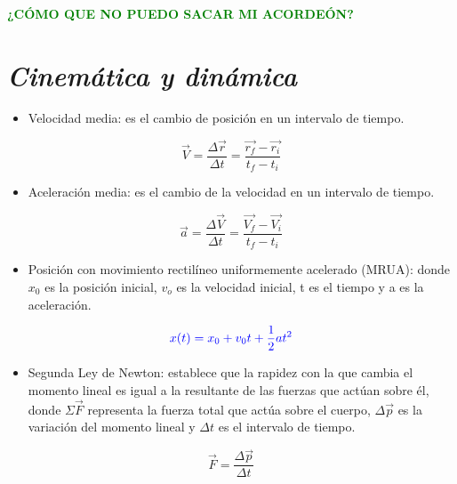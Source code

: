 \documentclass[letterpaper,12pt]{article}
\author{Nadia Rosales Orozco }
\date{27 de octubre de 2022}
\begin{document}
\textbf{\Large{\textcolor{Green}{¿CÓMO QUE NO PUEDO SACAR MI ACORDEÓN?}}}

\section{\textit{Cinemática y dinámica}}

\begin{itemize}
    \item [\ding{46}]
    \small{Velocidad media: es el cambio de posición en un intervalo de tiempo.}
    \end{itemize}
    \begin{equation*}%
    \vec{V}=\frac{\Delta\vec{r}}{\Delta{t}}=\frac{\vec{r_f}-\vec{r_i}}{t_f-t_i}
    \end{equation*}
    
    \begin{itemize}
    \item [\ding{40}]
    \small{Aceleración media: es el cambio de la velocidad en un intervalo de tiempo.}
    \end{itemize}
    \begin{equation*}%
    \vec{a}=\frac{\Delta\vec{V}}{\Delta{t}}=\frac{\vec{V_f}-\vec{V_i}}{t_f-t_i}
    \end{equation*}
    
    \begin{itemize}
    \item [\ding{119}]
    \small{Posición con movimiento rectilíneo uniformemente acelerado (MRUA): donde $x_0$ es la posición inicial, $v_o$ es la velocidad inicial, t es el tiempo y a es la aceleración.}
    \end{itemize}
    \begin{equation*}%
    \textcolor{blue}{x(t)=x_0+v_0t+\frac{1}{2}at^2}
    \end{equation*}
    
    \begin{itemize}
    \item [\ding{46}]
    \small{Segunda Ley de Newton: establece que la rapidez con la que cambia el momento lineal es igual a la resultante de las fuerzas que actúan sobre él, donde $\Sigma\vec{F}$ representa la fuerza total que actúa sobre el cuerpo, $\Delta\vec{p}$ es la variación del momento lineal y $\Delta t$ es el intervalo de tiempo.}
    \end{itemize}
    \begin{equation*}%
    \vec{F}=\frac{\Delta\vec{p}}{\Delta{t}}
    \end{equation*}
    
\end{document}
